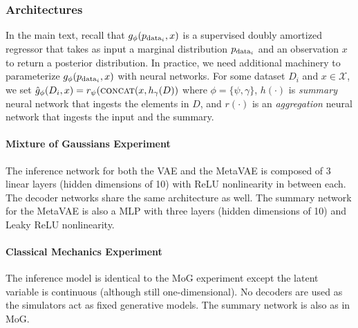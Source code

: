 \subsubsection{Architectures}

In the main text, recall that $g_\phi(p_{\textup{data}_i}, x)$ is a supervised doubly amortized regressor that takes as input a marginal distribution $p_{\textup{data}_i}$ and an observation $x$ to return a posterior distribution. In practice, we need additional machinery to parameterize $g_\phi(p_{\textup{data}_i}, x)$ with neural networks. For some dataset $D_i$ and $x \in \mathcal{X}$, we set $\hat{g}_\phi(D_i, x) = r_{\psi}(\textsc{concat}(x, h_{\gamma}(D))$ where $\phi = \{ \psi, \gamma \}$, $h(\cdot)$ is \textit{summary} neural network that ingests the elements in $D$, and $r(\cdot)$ is an \textit{aggregation} neural network that ingests the input and the summary.

\paragraph{Mixture of Gaussians Experiment} The inference network for both the VAE and the MetaVAE is composed of 3 linear layers (hidden dimensions of 10) with ReLU nonlinearity in between each. The decoder networks share the same architecture as well. The summary network for the MetaVAE is also a MLP with three layers (hidden dimensions of 10) and Leaky ReLU nonlinearity.

\paragraph{Classical Mechanics Experiment} The inference model is identical to the MoG experiment except the latent variable is continuous (although still one-dimensional). No decoders are used as the simulators act as fixed generative models. The summary network is also as in MoG. 


